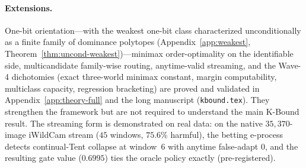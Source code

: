 \documentclass[conference]{IEEEtran}
\theoremstyle{plain}
\theoremstyle{definition}
\theoremstyle{remark}
\begin{document}
\paragraph{Extensions.} One-bit orientation---with the weakest one-bit class characterized
unconditionally as a finite family of dominance polytopes (Appendix~\ref{app:weakest},
Theorem~\ref{thm:uncond-weakest})---minimax order-optimality on the identifiable side,
multicandidate family-wise routing, anytime-valid streaming, and the Wave-4 dichotomies (exact
three-world minimax constant, margin computability, multiclass capacity, regression bracketing)
are proved and validated in Appendix~\ref{app:theory-full} and the long manuscript
(\texttt{kbound.tex}). They strengthen the framework but are not required to understand the main
K-Bound result. The streaming form is demonstrated on real data: on the native
$35{,}370$-image iWildCam stream ($45$ windows, $75.6\%$ harmful), the betting e-process detects
continual-Tent collapse at window~$6$ with anytime false-adapt $0$, and the resulting gate value
($0.6995$) ties the oracle policy exactly (pre-registered).
\end{document}
